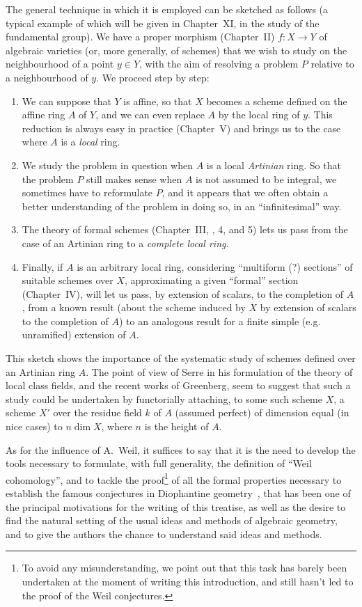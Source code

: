 \documentclass[openany,oneside]{amsbook}
\theoremstyle{ega-env-style}
\theoremstyle{ega-thm-env-style}
\theoremstyle{ega-defn-env-style}
\def\unsure#1{#1 {\color{red}(?)}}
\newcommand{\oldpage}[2][]{{\marginnote{\normalfont{\textbf{#1}~|~#2}}}\ignorespaces}
\begin{document}
The general technique in which it is employed can be sketched as follows (a typical example of which will be given in Chapter~XI, in the study of the fundamental group).
We have a proper morphism (Chapter~II) $f:X\to Y$ of algebraic varieties (or, more generally, of schemes) that we wish to study on the neighbourhood of a point $y\in Y$, with the aim of resolving a problem $P$ relative to a neighbourhood of $y$.
We proceed step by step:
\begin{enumerate}
  \item[1st]
    We can suppose that $Y$ is affine, so that $X$ becomes a scheme defined on the affine ring $A$ of $Y$, and we can even replace $A$ by the local ring of $y$.
    This reduction is always easy in practice (Chapter~V) and brings us to the case where $A$ is a \emph{local} ring.
  \item[2nd]
    We study the problem in question when $A$ is a local \emph{Artinian} ring.
    So that the problem $P$ still makes sense when $A$ is not assumed to be integral, we sometimes have to reformulate $P$, and it appears that we often obtain a better understanding of the problem in doing so, in an ``infinitesimal'' way.
  \item[3rd]
    The theory of formal schemes (Chapter~III, \textsection{}, 4, and 5) lets us pass from the case of an Artinian ring to a \emph{complete local ring}.
  \item[4th]
    Finally, if $A$ is an arbitrary local ring, considering ``\unsure{multiform} sections'' of suitable schemes over $X$, approximating a given ``formal'' section (Chapter~IV), will let us pass,
\oldpage[I]{9}
by extension of scalars, to the completion of $A$, from a known result (about the scheme induced by $X$ by extension of scalars to the completion of $A$) to an analogous result for a finite simple (e.g. unramified) extension of $A$.
\end{enumerate}

This sketch shows the importance of the systematic study of schemes defined over an Artinian ring $A$.
The point of view of Serre in his formulation of the theory of local class fields, and the recent works of Greenberg, seem to suggest that such a study could be undertaken by functorially attaching, to some such scheme $X$, a scheme $X'$ over the residue field $k$ of $A$ (assumed perfect) of dimension equal (in nice cases) to $n\dim X$, where $n$ is the height of $A$.

As for the influence of A.~Weil, it suffices to say that it is the need to develop the tools necessary to formulate, with full generality, the definition of ``Weil cohomology'', and to tackle the proof\footnote{To avoid any misunderstanding, we point out that this task has barely been undertaken at the moment of writing this introduction, and still hasn't led to the proof of the Weil conjectures.} of all the formal properties necessary to establish the famous conjectures in Diophantine geometry~\cite{I-19}, that has been one of the principal motivations for the writing of this treatise, as well as the desire to find the natural setting of the usual ideas and methods of algebraic geometry, and to give the authors the chance to understand said ideas and methods.
\end{document}
